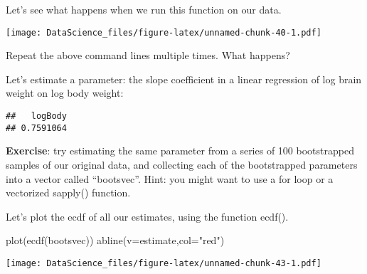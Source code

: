 \documentclass[
]{book}
\newenvironment{Shaded}{\begin{snugshade}}{\end{snugshade}}
\newcommand{\AttributeTok}[1]{\textcolor[rgb]{0.77,0.63,0.00}{#1}}
\newcommand{\DecValTok}[1]{\textcolor[rgb]{0.00,0.00,0.81}{#1}}
\newcommand{\FunctionTok}[1]{\textcolor[rgb]{0.00,0.00,0.00}{#1}}
\newcommand{\NormalTok}[1]{#1}
\newcommand{\OtherTok}[1]{\textcolor[rgb]{0.56,0.35,0.01}{#1}}
\newcommand{\SpecialCharTok}[1]{\textcolor[rgb]{0.00,0.00,0.00}{#1}}
\newcommand{\StringTok}[1]{\textcolor[rgb]{0.31,0.60,0.02}{#1}}
\begin{document}
Let's see what happens when we run this function on our data.

\begin{Shaded}
\end{Shaded}

\texttt{[image: DataScience\_files/figure-latex/unnamed-chunk-40-1.pdf]}

Repeat the above command lines multiple times. What happens?

Let's estimate a parameter: the slope coefficient in a linear regression of log brain weight on log body weight:

\begin{Shaded}
\end{Shaded}

\begin{verbatim}
##   logBody 
## 0.7591064
\end{verbatim}

\textbf{Exercise}: try estimating the same parameter from a series of 100 bootstrapped samples of our original data, and collecting each of the bootstrapped parameters into a vector called ``bootsvec''. Hint: you might want to use a for loop or a vectorized sapply() function.

Let's plot the ecdf of all our estimates, using the function ecdf().

\begin{Shaded}
\begin{Highlighting}[]
\FunctionTok{plot}\NormalTok{(}\FunctionTok{ecdf}\NormalTok{(bootsvec))}
\FunctionTok{abline}\NormalTok{(}\AttributeTok{v=}\NormalTok{estimate,}\AttributeTok{col=}\StringTok{"red"}\NormalTok{)}
\end{Highlighting}
\end{Shaded}

\texttt{[image: DataScience\_files/figure-latex/unnamed-chunk-43-1.pdf]}
\end{document}
